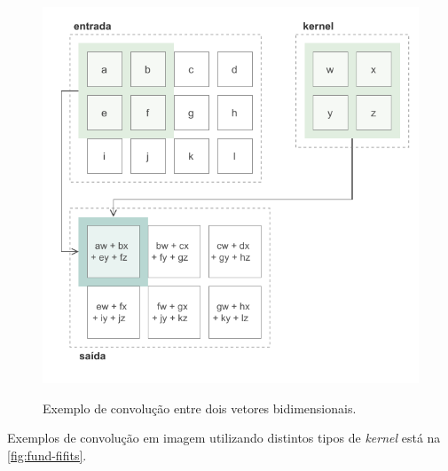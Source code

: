 \begin{figure}[h!] %
  \centering
  \caption{Exemplo de convolução entre dois vetores bidimensionais.}
  \includegraphics[scale=1.1]{img/img-fundamentacao-kernel.pdf}
  \label{fig:fund-kernel}
\end{figure}

Exemplos de convolução em imagem utilizando distintos tipos de \textit{kernel} está na \autoref{fig:fund-fifits}.

